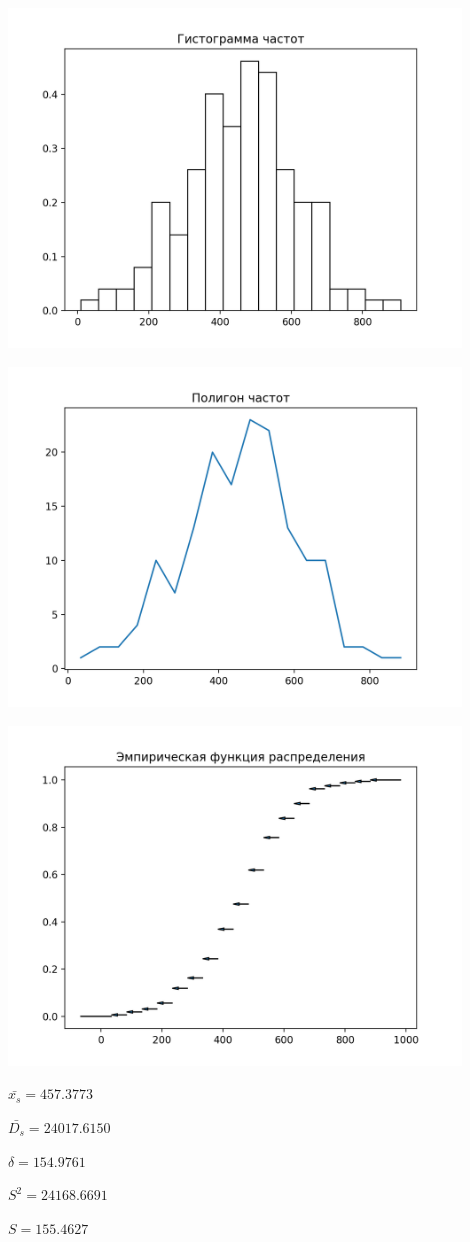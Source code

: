 \includegraphics[width=0.9\textwidth]{src/gr11}

\includegraphics[width=0.9\textwidth]{src/gr12}

\includegraphics[width=0.9\textwidth]{src/gr13}

$\bar{x_{s}} = 457.3773$

$\bar{D_{s}} = 24017.6150$

$\delta = 154.9761$

$S^2 = 24168.6691$

$S = 155.4627$